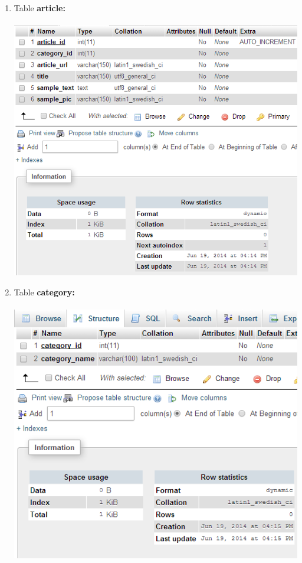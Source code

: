 \documentclass[12pt]{article}
\begin{document}
\begin{enumerate}
\item{Table \textbf{article:}}\\ \\
\includegraphics[scale=0.8]{img/article_table}

\vfill

\item{Table \textbf{category:}}\\ \\
\includegraphics[scale=0.8]{img/category_table}


\end{enumerate}
\end{document}
